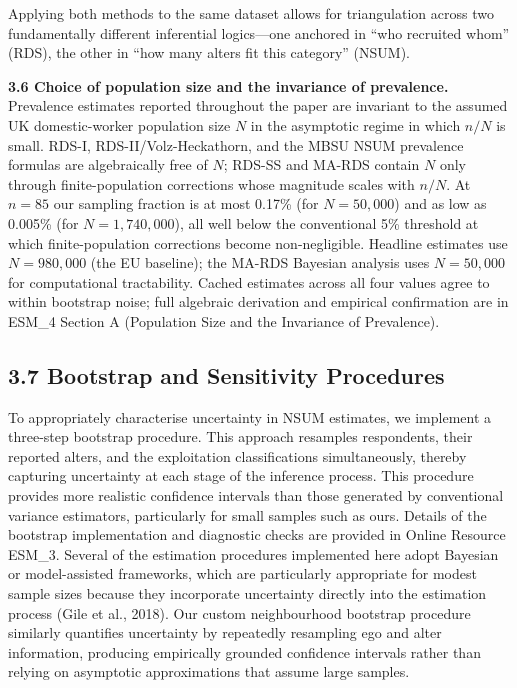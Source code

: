 \documentclass[
  12pt,
  letterpaper,
  DIV=11,
  numbers=noendperiod]{scrartcl}
\begin{document}
Applying both methods to the same dataset allows for triangulation
across two fundamentally different inferential logics---one anchored in
``who recruited whom'' (RDS), the other in ``how many alters fit this
category'' (NSUM).

\textbf{3.6 Choice of population size and the invariance of prevalence.}
Prevalence estimates reported throughout the paper are invariant to the
assumed UK domestic-worker population size \(N\) in the asymptotic
regime in which \(n/N\) is small. RDS-I, RDS-II/Volz-Heckathorn, and the
MBSU NSUM prevalence formulas are algebraically free of \(N\); RDS-SS
and MA-RDS contain \(N\) only through finite-population corrections
whose magnitude scales with \(n/N\). At \(n = 85\) our sampling fraction
is at most 0.17\% (for \(N = 50{,}000\)) and as low as 0.005\% (for
\(N = 1{,}740{,}000\)), all well below the conventional 5\% threshold at
which finite-population corrections become non-negligible. Headline
estimates use \(N = 980{,}000\) (the EU baseline); the MA-RDS Bayesian
analysis uses \(N = 50{,}000\) for computational tractability. Cached
estimates across all four values agree to within bootstrap noise; full
algebraic derivation and empirical confirmation are in ESM\_4 Section A
(Population Size and the Invariance of Prevalence).

\subsection{3.7 Bootstrap and Sensitivity
Procedures}\label{sec-bootstrap}

To appropriately characterise uncertainty in NSUM estimates, we
implement a three-step bootstrap procedure. This approach resamples
respondents, their reported alters, and the exploitation classifications
simultaneously, thereby capturing uncertainty at each stage of the
inference process. This procedure provides more realistic confidence
intervals than those generated by conventional variance estimators,
particularly for small samples such as ours. Details of the bootstrap
implementation and diagnostic checks are provided in Online Resource
ESM\_3. Several of the estimation procedures implemented here adopt
Bayesian or model-assisted frameworks, which are particularly
appropriate for modest sample sizes because they incorporate uncertainty
directly into the estimation process (Gile et al., 2018). Our custom
neighbourhood bootstrap procedure similarly quantifies uncertainty by
repeatedly resampling ego and alter information, producing empirically
grounded confidence intervals rather than relying on asymptotic
approximations that assume large samples.
\end{document}
